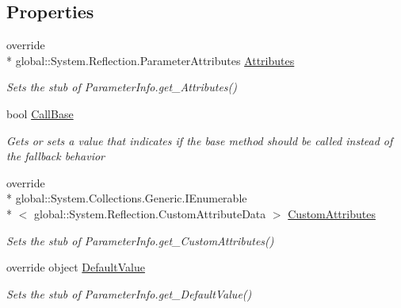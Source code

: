 \subsection*{Properties}
\begin{DoxyCompactItemize}
\item 
override \\*
global\-::\-System.\-Reflection.\-Parameter\-Attributes \hyperlink{class_system_1_1_reflection_1_1_fakes_1_1_stub_parameter_info_a2cb7e25b330b5f38ce1b8170117b95a4}{Attributes}
\begin{DoxyCompactList}\small\item\em Sets the stub of Parameter\-Info.\-get\-\_\-\-Attributes()\end{DoxyCompactList}\item 
bool \hyperlink{class_system_1_1_reflection_1_1_fakes_1_1_stub_parameter_info_a9274f2a17e00e2f84533fd40627ac300}{Call\-Base}
\begin{DoxyCompactList}\small\item\em Gets or sets a value that indicates if the base method should be called instead of the fallback behavior\end{DoxyCompactList}\item 
override \\*
global\-::\-System.\-Collections.\-Generic.\-I\-Enumerable\\*
$<$ global\-::\-System.\-Reflection.\-Custom\-Attribute\-Data $>$ \hyperlink{class_system_1_1_reflection_1_1_fakes_1_1_stub_parameter_info_a45735506c739801bedc3a6af6f9a322c}{Custom\-Attributes}
\begin{DoxyCompactList}\small\item\em Sets the stub of Parameter\-Info.\-get\-\_\-\-Custom\-Attributes()\end{DoxyCompactList}\item 
override object \hyperlink{class_system_1_1_reflection_1_1_fakes_1_1_stub_parameter_info_a5740fa043ff02e9d2d7bf4c4c2de2f77}{Default\-Value}
\begin{DoxyCompactList}\small\item\em Sets the stub of Parameter\-Info.\-get\-\_\-\-Default\-Value()\end{DoxyCompactList}\item 

\end{DoxyCompactItemize}

